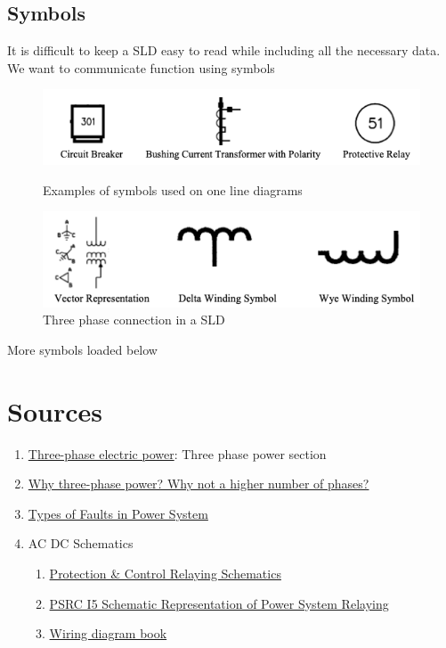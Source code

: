 \subsection{Symbols}
It is difficult to keep a SLD easy to read while including all the necessary data. We want to communicate function using symbols
\begin{figure}[H]
    \centering
    \includegraphics[scale = 0.5]{figs/ch03/sld_symbol.png}
    \caption{Examples of symbols used on one line diagrams}
    \includegraphics[scale = 0.5]{figs/ch03/sld_3phase.png}
    \caption{Three phase connection in a SLD}
\end{figure}

More symbols loaded below



\section{Sources}
\begin{enumerate}
    \item \href{https://en.wikipedia.org/wiki/Three-phase_electric_power}{Three-phase electric power}: Three phase power section
    \item \href{https://electronics.stackexchange.com/questions/185308/why-three-phase-power-why-not-a-higher-number-of-phases}{Why three-phase power? Why not a higher number of phases?}
    \item \href{https://circuitglobe.com/types-of-faults-in-power-system.html}{Types of Faults in Power System}
    \item AC DC Schematics
    \begin{enumerate}
        \item \href{https://electrical-engineering-portal.com/ac-dc-schematics-protection-control-relaying}{Protection \& Control Relaying Schematics}
        \item \href{https://www.pes-psrc.org/kb/report/047.pdf}{PSRC I5 Schematic Representation of Power System Relaying}
        \item \href{https://www.daltco.com/sites/daltco.com/files/resource/schneider-wiring-diagram-book.pdf}{Wiring diagram book}
    \end{enumerate}
\end{enumerate}